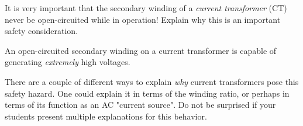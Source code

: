 

It is very important that the secondary winding of a {\it current transformer} (CT) never be open-circuited while in operation!  Explain why this is an important safety consideration.







An open-circuited secondary winding on a current transformer is capable of generating {\it extremely} high voltages.







There are a couple of different ways to explain {\it why} current transformers pose this safety hazard.  One could explain it in terms of the winding ratio, or perhaps in terms of its function as an AC "current source".  Do not be surprised if your students present multiple explanations for this behavior.




